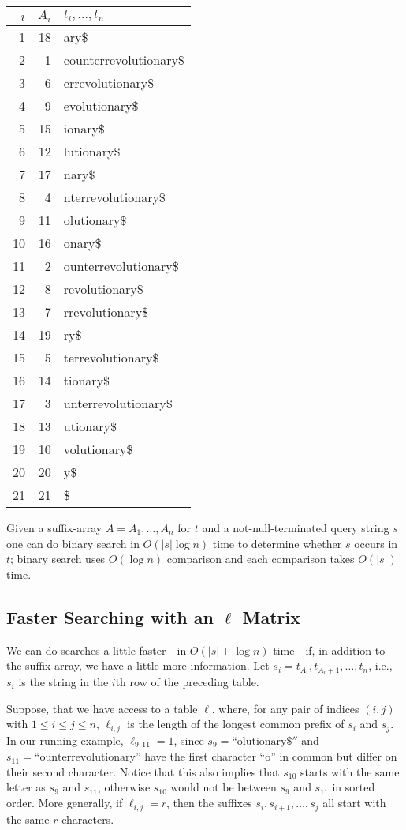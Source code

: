 \begin{center}
  \begin{tabular}{|r|r|l|}\hline
    $i$ & $A_i$ & $t_i,\ldots,t_n$ \\\hline
1&18&ary\$\\
2&1&counterrevolutionary\$\\
3&6&errevolutionary\$\\
4&9&evolutionary\$\\
5&15&ionary\$\\
6&12&lutionary\$\\
7&17&nary\$\\
8&4&nterrevolutionary\$\\
9&11&olutionary\$\\
10&16&onary\$\\
11&2&ounterrevolutionary\$\\
12&8&revolutionary\$\\
13&7&rrevolutionary\$\\
14&19&ry\$\\
15&5&terrevolutionary\$\\
16&14&tionary\$\\
17&3&unterrevolutionary\$\\
18&13&utionary\$\\
19&10&volutionary\$\\
20&20&y\$\\
21&21&\$\\\hline
\end{tabular}
\end{center}

Given a suffix-array $A=A_1,\ldots,A_n$ for $t$ and a not-null-terminated
query string $s$ one can do binary search in $O(|s|\log n)$ time to
determine whether $s$ occurs in $t$;  binary search uses $O(\log n)$
comparison and each comparison takes $O(|s|)$ time.

\subsection{Faster Searching with an $\ell$ Matrix}

We can do searches a little faster---in $O(|s|+\log n)$ time---if,
in addition to the suffix array, we have a little more information.
Let $s_i=t_{A_i}, t_{A_i+1},\ldots,t_{n}$, i.e., $s_i$ is the string in
the $i$th row of the preceding table.

Suppose, that we have access to a table $\ell$, where, for any
pair of indices $(i,j)$ with $1\le i\le j\le n$, $\ell_{i,j}$ is
the length of the longest common prefix of $s_i$ and $s_j$. In our
running example, $\ell_{9,11}=1$, since $s_9=\text{``olutionary\$}''$
and $s_{11}=\text{``ounterrevolutionary''}$ have the first character
``o'' in common but differ on their second character.  Notice that
this also implies that $s_{10}$ starts with the same letter as $s_9$
and $s_{11}$, otherwise $s_{10}$ would not be between $s_9$ and $s_{11}$
in sorted order.  More generally, if $\ell_{i,j}=r$, then the suffixes
$s_i,s_{i+1},\ldots,s_{j}$ all start with the same $r$ characters.

